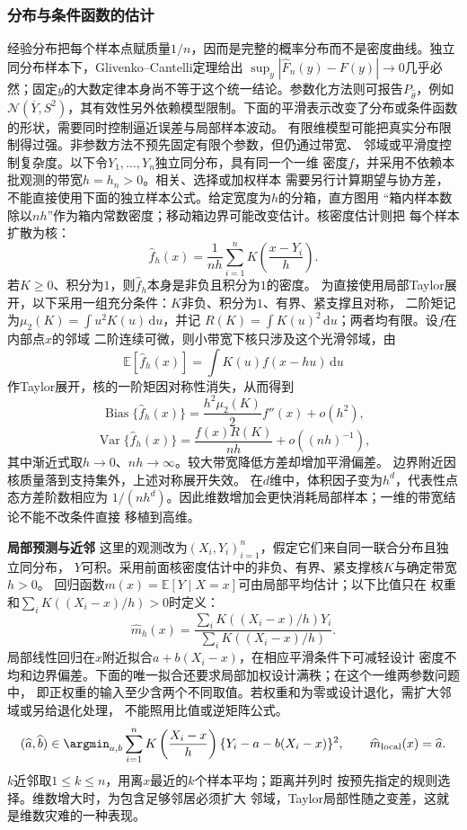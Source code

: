 \subsubsection{分布与条件函数的估计}
\label{sec:statistics-nonparametric-missing}
经验分布把每个样本点赋质量\(1/n\)，因而是完整的概率分布而不是密度曲线。独立同分布样本下，Glivenko--Cantelli定理给出
\(\sup_y|\widehat F_n(y)-F(y)|\to0\)几乎必然；固定\(y\)的大数定律本身尚不等于这个统一结论。参数化方法则可报告\(P_{\widehat\theta}\)，例如
\(\mathcal N(\overline Y,S^2)\)，其有效性另外依赖模型限制。下面的平滑表示改变了分布或条件函数的形状，需要同时控制逼近误差与局部样本波动。
有限维模型可能把真实分布限制得过强。非参数方法不预先固定有限个参数，但仍通过带宽、
邻域或平滑度控制复杂度。以下令\(Y_1,\ldots,Y_n\)独立同分布，具有同一个一维
密度\(f\)，并采用不依赖本批观测的带宽\(h=h_n>0\)。相关、选择或加权样本
需要另行计算期望与协方差，不能直接使用下面的独立样本公式。给定宽度为\(h\)的分箱，直方图用
“箱内样本数除以\(nh\)”作为箱内常数密度；移动箱边界可能改变估计。核密度估计则把
每个样本扩散为核：
\[
  \widehat f_h(x)
  =\frac1{nh}\sum_{i=1}^n
    K\left(\frac{x-Y_i}{h}\right).
\]
若\(K\geq0\)、积分为\(1\)，则\(\widehat f_h\)本身是非负且积分为\(1\)的密度。
为直接使用局部Taylor展开，以下采用一组充分条件：\(K\)非负、积分为\(1\)、有界、紧支撑且对称，
二阶矩记为\(\mu_2(K)=\int u^2K(u)\,\mathrm du\)，并记
\(R(K)=\int K(u)^2\,\mathrm du\)；两者均有限。设\(f\)在内部点\(x\)的邻域
二阶连续可微，则小带宽下核只涉及这个光滑邻域，由
\[
  \mathbb{E}[\widehat f_h(x)]
  =\int K(u)f(x-hu)\,\mathrm du
\]
作Taylor展开，核的一阶矩因对称性消失，从而得到
\[
  \operatorname{Bias}\{\widehat f_h(x)\}
  =\frac{h^2\mu_2(K)}2f''(x)+o(h^2),
\]
\[
  \operatorname{Var}\{\widehat f_h(x)\}
  =\frac{f(x)R(K)}{nh}+o((nh)^{-1}),
\]
其中渐近式取\(h\to0\)、\(nh\to\infty\)。较大带宽降低方差却增加平滑偏差。
边界附近因核质量落到支持集外，上述对称展开失效。
在\(d\)维中，体积因子变为\(h^d\)，代表性点态方差阶数相应为
\(1/(nh^d)\)。因此维数增加会更快消耗局部样本；一维的带宽结论不能不改条件直接
移植到高维。

\par\medskip\noindent\textbf{局部预测与近邻}\quad
这里的观测改为\((X_i,Y_i)_{i=1}^n\)，假定它们来自同一联合分布且独立同分布，
\(Y\)可积。采用前面核密度估计中的非负、有界、紧支撑核\(K\)与确定带宽\(h>0\)。
回归函数\(m(x)=\mathbb{E}[Y\mid X=x]\)可由局部平均估计；以下比值只在
权重和\(\sum_iK((X_i-x)/h)>0\)时定义：
\[
  \widehat m_h(x)=
  \frac{\sum_iK((X_i-x)/h)Y_i}
       {\sum_iK((X_i-x)/h)}.
\]
局部线性回归在\(x\)附近拟合\(a+b(X_i-x)\)，在相应平滑条件下可减轻设计
密度不均和边界偏差。下面的唯一拟合还要求局部加权设计满秩；在这个一维两参数问题中，
即正权重的输入至少含两个不同取值。若权重和为零或设计退化，需扩大邻域或另给退化处理，
不能照用比值或逆矩阵公式。
\[
  (\widehat a,\widehat b)
  \in\argmin_{a,b}\sum_{i=1}^n
  K\left(\frac{X_i-x}{h}\right)
  \{Y_i-a-b(X_i-x)\}^2,
  \qquad \widehat m_{\mathrm{local}}(x)=\widehat a.
\]
\(k\)近邻取\(1\leq k\leq n\)，用离\(x\)最近的\(k\)个样本平均；距离并列时
按预先指定的规则选择。维数增大时，为包含足够邻居必须扩大
邻域，Taylor局部性随之变差，这就是维数灾难的一种表现。

